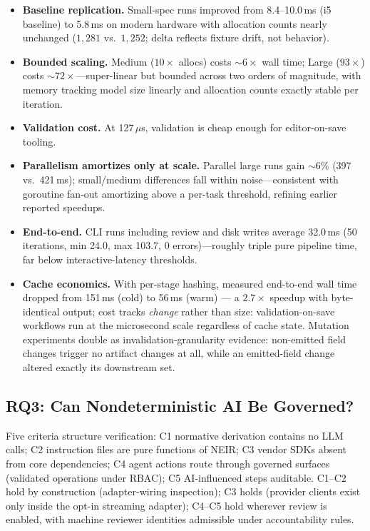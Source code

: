 \documentclass[sigconf,nonacm]{acmart}
\begin{document}
\begin{itemize}
  \item \textbf{Baseline replication.} Small-spec runs improved from 8.4--10.0\,ms (i5 baseline) to 5.8\,ms on modern hardware with allocation counts nearly unchanged ($1{,}281$ vs.\ $1{,}252$; delta reflects fixture drift, not behavior).
  \item \textbf{Bounded scaling.} Medium ($10\times$ allocs) costs ${\sim}6\times$ wall time; Large ($93\times$) costs ${\sim}72\times$---super-linear but bounded across two orders of magnitude, with memory tracking model size linearly and allocation counts exactly stable per iteration.
  \item \textbf{Validation cost.} At 127\,$\mu$s, validation is cheap enough for editor-on-save tooling.
  \item \textbf{Parallelism amortizes only at scale.} Parallel large runs gain ${\sim}6\%$ (397 vs.\ 421\,ms); small/medium differences fall within noise---consistent with goroutine fan-out amortizing above a per-task threshold, refining earlier reported speedups.
  \item \textbf{End-to-end.} CLI runs including review and disk writes average 32.0\,ms (50 iterations, min 24.0, max 103.7, 0 errors)---roughly triple pure pipeline time, far below interactive-latency thresholds.
  \item \textbf{Cache economics.} With per-stage hashing, measured end-to-end wall time dropped from 151\,ms (cold) to 56\,ms (warm) --- a $2.7\times$ speedup with byte-identical output; cost tracks \emph{change} rather than size: validation-on-save workflows run at the microsecond scale regardless of cache state. Mutation experiments double as invalidation-granularity evidence: non-emitted field changes trigger no artifact changes at all, while an emitted-field change altered exactly its downstream set.
\end{itemize}

\subsection{RQ3: Can Nondeterministic AI Be Governed?}
Five criteria structure verification: C1 normative derivation contains no LLM calls; C2 instruction files are pure functions of NEIR; C3 vendor SDKs absent from core dependencies; C4 agent actions route through governed surfaces (validated operations under RBAC); C5 AI-influenced steps auditable. C1--C2 hold by construction (adapter-wiring inspection); C3 holds (provider clients exist only inside the opt-in streaming adapter); C4--C5 hold wherever review is enabled, with machine reviewer identities admissible under accountability rules.
\end{document}

